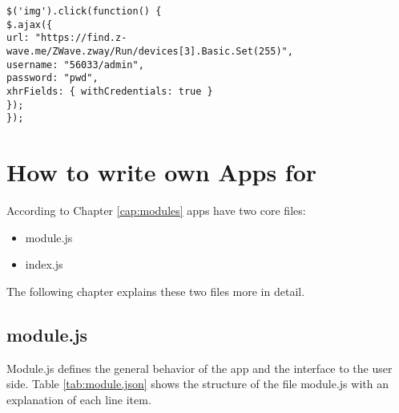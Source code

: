 \begin{lstlisting}[caption=Login with jQuery,basicstyle=\small,columns=fullflexible]
$('img').click(function() {
$.ajax({
url: "https://find.z-wave.me/ZWave.zway/Run/devices[3].Basic.Set(255)",
username: "56033/admin",
password: "pwd",
xhrFields: { withCredentials: true }
});
});
\end{lstlisting}

\section{How to write own Apps for \zway}
\label{developownapps}

According to Chapter \ref{cap:modules} apps have two core files:

\begin{itemize}
\item module.js
\item index.js
\end{itemize}

The following chapter explains these two files more in detail. 

\subsection{module.js}

Module.js defines the general behavior of the app and the interface to the user side.
Table \ref{tab:module.json} 
shows the structure of the file module.js with an explanation of each line item.

